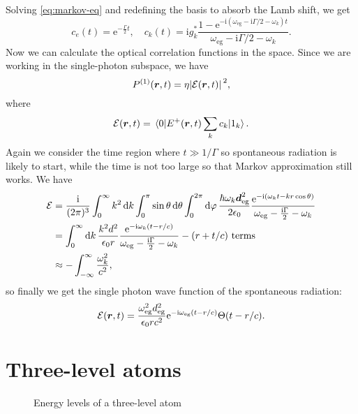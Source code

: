 \documentclass[hyperref, a4paper]{article}
\newcommand*{\ii}{\mathrm{i}}
\newcommand*{\ee}{\mathrm{e}}
\begin{document}
Solving \eqref{eq:markov-eq} and redefining the basis to absorb the Lamb shift, we get 
\begin{equation}
    c_{e}(t) = \ee^{- \frac{\Gamma}{2} t}, \quad 
    c_{k}(t) = \ii g_k^* \frac{1 - \ee^{- \ii (\omega_\text{eg} - \ii \Gamma / 2 - \omega_k) t}}{\omega_\text{eg} - \ii \Gamma / 2 - \omega_k} .
\end{equation}
Now we can calculate the optical correlation functions in the space. Since we are working in the single-photon 
subspace, we have 
\begin{equation}
    P^{(1)}(\vb*{r}, t) = \eta \abs*{\mathcal{E}(\vb*{r}, t)}^2,
\end{equation}
where 
\begin{equation}
    \mathcal{E}(\vb*{r}, t) = \mel{0}{E^+(\vb*{r}, t) \sum_k c_k }{1_k}.
\end{equation}
Again we consider the time region where $t \gg 1 / \Gamma$ so spontaneous radiation is likely to start, while the 
time is not too large so that Markov approximation still works. We have 
\[
    \begin{aligned}
        \mathcal{E} &= \frac{\ii}{(2\pi)^3} \int_0^\infty k^2 \dd{k} \int_0^\pi \sin \theta \dd{\theta}
        \int_0^{2\pi} \dd{\varphi} \frac{\hbar \omega_k \vb*{d}_\text{eg}^2}{2 \epsilon_0} 
        \frac{\ee^{- \ii (\omega_k t - k r \cos \theta)}}{ \omega_\text{eg} - \frac{\ii \Gamma}{2} - \omega_k} \\
        &= \int_0^\infty \dd{k} \frac{k^2 d^2}{\epsilon_0 r} \frac{\ee^{- \ii \omega_k (t - r / c)}}{\omega_\text{eg} - \frac{\ii \Gamma}{2} - \omega_k} - \text{$(r + t/c)$ terms} \\
        &\approx - \int_{-\infty}^\infty \frac{\omega_k^2}{c^2} ,
    \end{aligned}
\]
so finally we get the single photon wave function of the spontaneous radiation:
\begin{equation}
    \mathcal{E}(\vb*{r}, t) = \frac{\omega_\text{eg}^2 d_\text{eg}^2}{\epsilon_0 r c^2} 
    \ee^{- \ii \omega_\text{eg} (t - r / c)} \Theta(t - r/c).
\end{equation}

\section{Three-level atoms}

\begin{figure}
    \centering
    
    \caption{Energy levels of a three-level atom}
    \label{fig:three-level-atom}
\end{figure}
\end{document}
